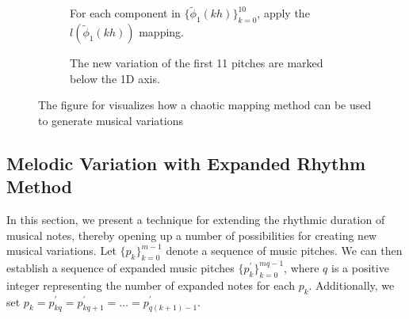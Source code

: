 \documentclass[11pt]{article}
\theoremstyle{definition}
\begin{document}
\begin{figure}
\begin{subfigure}{\textwidth}
  \caption{For each component in $\{\tilde{\phi}_1(kh)\}_{k=0}^{10}$, apply the $l(\tilde{\phi}_1(kh))$ mapping.}
  \label{subfig:traj2nmp}

\end{subfigure}

\vspace{5pt}

\begin{subfigure}{\textwidth}
  \centering
  \caption{The new variation of the first 11 pitches are marked below the 1D axis.}
  \label{subfig:nmp}

\end{subfigure}

\caption{The figure for visualizes how a chaotic mapping method can be used to generate musical variations}
\label{fig:dabby method}
\end{figure}

\subsection{Melodic Variation with Expanded Rhythm Method} 
\label{subsec: melodicvariationwithexpandedrhythm}

In this section, we present a technique for extending the rhythmic duration of musical notes, thereby opening up a number of possibilities for creating new musical variations. 
Let $\{p_k\}_{k=0}^{m-1}$ denote a sequence of music pitches. 
We can then establish a sequence of expanded music pitches $\{p^\prime_k\}_{k=0}^{mq-1}$, where $q$ is a positive integer representing the number of expanded notes for each $p_k$. Additionally, we set $p_k = p^\prime_{kq} = p^\prime_{kq + 1} = \dots = p^\prime_{q(k + 1) - 1}$.
\end{document}
